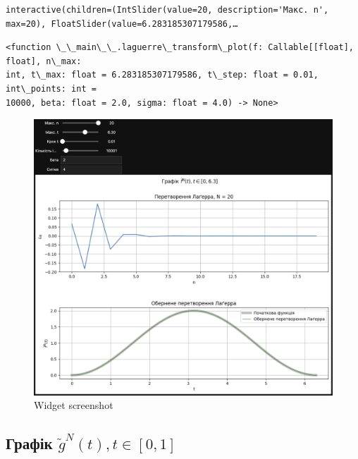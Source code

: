 \documentclass[11pt]{article}
\makeatletter
\newcommand{\boxspacing}{\kern\kvtcb@left@rule\kern\kvtcb@boxsep}
\newcommand{\prompt}[4]{
        {\ttfamily\llap{{\color{#2}[#3]:\hspace{3pt}#4}}\vspace{-\baselineskip}}
    }
\makeatother
\begin{document}
    
    \begin{Verbatim}[commandchars=\\\{\}]
interactive(children=(IntSlider(value=20, description='Макс. n', max=20), FloatSlider(value=6.283185307179586,…
    \end{Verbatim}

    
            \begin{tcolorbox}[breakable, size=fbox, boxrule=.5pt, pad at break*=1mm, opacityfill=0]
\prompt{Out}{outcolor}{16}{\boxspacing}
\begin{Verbatim}[commandchars=\\\{\}]
<function \_\_main\_\_.laguerre\_transform\_plot(f: Callable[[float], float], n\_max:
int, t\_max: float = 6.283185307179586, t\_step: float = 0.01, int\_points: int =
10000, beta: float = 2.0, sigma: float = 4.0) -> None>
\end{Verbatim}
\end{tcolorbox}
        
    \begin{figure}
\centering
\includegraphics{screenshots/7.png}
\caption{Widget screenshot}
\end{figure}
\newpage

    \subsection*{\texorpdfstring{Графік
\(\widetilde{g}^N(t), t\in[0, 1]\)}{Графік \textbackslash widetilde\{g\}\^{}N(t), t\textbackslash in{[}0, 1{]}}}\label{ux433ux440ux430ux444ux456ux43a-widetildegnt-tin0-1}
\end{document}
